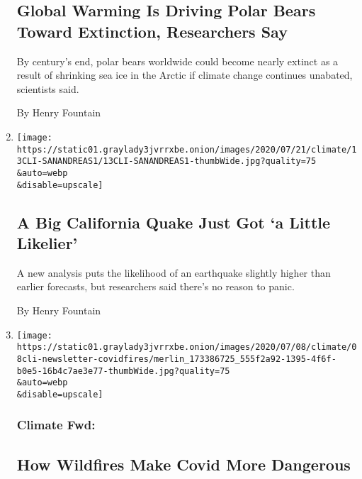 \begin{enumerate}
{  \subsection{Global Warming Is Driving Polar Bears Toward Extinction,
  Researchers
  Say}\label{global-warming-is-driving-polar-bears-toward-extinction-researchers-say}}

  By century's end, polar bears worldwide could become nearly extinct as
  a result of shrinking sea ice in the Arctic if climate change
  continues unabated, scientists said.

  By Henry Fountain
\item
  \href{/2020/07/13/climate/california-san-andreas-fault-earthquake.html}{}

  \texttt{[image: https://static01.graylady3jvrrxbe.onion/images/2020/07/21/climate/13CLI-SANANDREAS1/13CLI-SANANDREAS1-thumbWide.jpg?quality=75\\\&auto=webp\\\&disable=upscale]}

  \hypertarget{a-big-california-quake-just-got-a-little-likelier}{%
  \subsection{A Big California Quake Just Got `a Little
  Likelier'}\label{a-big-california-quake-just-got-a-little-likelier}}

  A new analysis puts the likelihood of an earthquake slightly higher
  than earlier forecasts, but researchers said there's no reason to
  panic.

  By Henry Fountain
\item
  \href{/2020/07/08/climate/wildfires-smoke-covid-coronavirus.html}{}

  \texttt{[image: https://static01.graylady3jvrrxbe.onion/images/2020/07/08/climate/08cli-newsletter-covidfires/merlin\_173386725\_555f2a92-1395-4f6f-b0e5-16b4c7ae3e77-thumbWide.jpg?quality=75\\\&auto=webp\\\&disable=upscale]}

  \hypertarget{climate-fwd}{%
  \subsubsection{Climate Fwd:}\label{climate-fwd}}

  \hypertarget{how-wildfires-make-covid-more-dangerous}{%
  \subsection{How Wildfires Make Covid More
  Dangerous}\label{how-wildfires-make-covid-more-dangerous}}


\end{enumerate}
